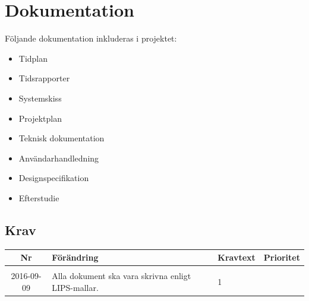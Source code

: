 \documentclass[a4paper,titlepage,12pt]{article}
\newcounter{reqNr}
\newcounter{reqNrII}
\newcommand{\nextReqNrII}{\stepcounter{reqNrII}\arabic{reqNrII}}
\newcommand{\newRequirement}[1] {\pbox{5cm}{Tillagt \\#1}}
\begin{document}
	\section{Dokumentation}
    Följande dokumentation inkluderas i projektet:
    \begin{itemize}
		\item Tidplan
        \item Tidsrapporter
		\item Systemskiss 
		\item Projektplan
		\item Teknisk dokumentation 
		\item Användarhandledning 
        \item Designspecifikation
        \item Efterstudie
    \end{itemize}

	\subsection{Krav}
	\begin{longtable}[c]{ c l>{\raggedright}p{} l }
		\textbf{Nr} & \textbf{Förändring} & \textbf{Kravtext} & \textbf{Prioritet} 
			\\ \midrule

		\nextReqNrII & \newRequirement{2016-09-09} & Alla dokument ska vara skrivna
		enligt LIPS-mallar. & 1
			\\ 

	\end{longtable}
\end{document}
